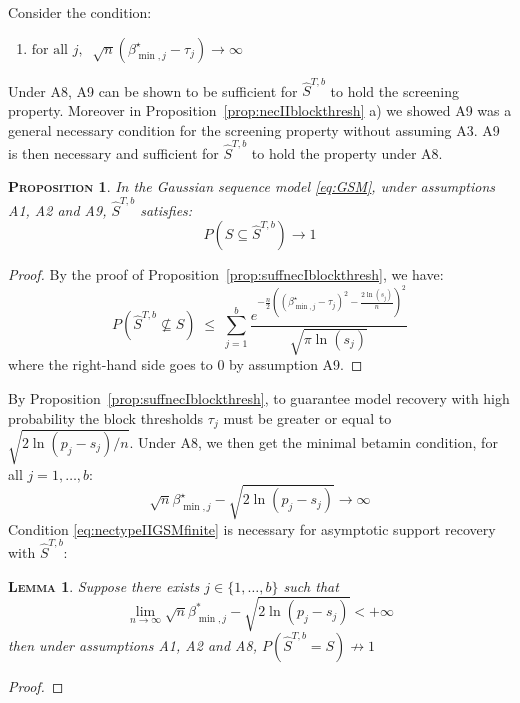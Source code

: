 \documentclass[aos]{imsart}
\theoremstyle{plain}
\newtheorem{prop}{\textsc{Proposition}}[section]
\newtheorem{lem}{\textsc{Lemma}}[section]
\begin{document}
\begin{supplement}
Consider the condition:
\begin{enumerate}[start=9,label={(A\arabic*)}]
    \item $\text{for all } j, \;\; \sqrt{n}(\beta_{\min,j}^{\star}-\tau_j) \to \infty$
\end{enumerate}
Under A8, A9 can be shown to be sufficient for $\hat{S}^{T,b}$ to hold the screening property. Moreover in Proposition~\ref{prop:necIIblockthresh} a) we showed A9 was a general necessary condition for the screening property without assuming A3. A9 is then necessary and sufficient for $\hat{S}^{T,b}$ to hold the property under A8.
\begin{prop}\label{prop:suffnecIIblockthreshbis}
 In the Gaussian sequence model \eqref{eq:GSM}, under assumptions A1, A2 and A9, $\hat{S}^{T,b}$ satisfies:
$$P(S\subseteq \hat{S}^{T,b} ) \to 1$$
\end{prop}
\begin{proof}
    By the proof of Proposition~\ref{prop:suffnecIblockthresh}, we have: \begin{equation*}
P\left(\hat{S}^{T,b} \not\subseteq S\right)\;\leq\; \sum_{j=1}^b\frac{e^{-\tfrac{n}{2}\left((\beta^\star_{\min,j}-\tau_j)^2-\tfrac{2\ln(s_j)}{n}\right)^2}}{\sqrt{\pi\ln(s_j)}}
 \end{equation*}
 where the right-hand side goes to 0 by assumption A9.
\end{proof}
By Proposition~\ref{prop:suffnecIblockthresh}, to guarantee model recovery with high probability the block thresholds $\tau_j$ must be greater or equal to $\sqrt{2\ln(p_j-s_j)/n}$. Under A8, we then get the minimal betamin condition, for all $j=1,\ldots,b$:
\begin{equation}\label{eq:nectypeIIGSMfinite}
    \sqrt{n}\beta_{\min,j}^{\star}-\sqrt{2\ln(p_j-s_j)} \to \infty
\end{equation}
Condition \eqref{eq:nectypeIIGSMfinite} is necessary for asymptotic support recovery with $\hat{S}^{T,b}$:
\begin{lem}\label{lem:necbetaminblockthresh2}
    Suppose there exists $j\in\{1,\ldots,b\}$ such that
    \begin{equation}\label{eq:necbetaminblockthreshbis}
      \lim_{n\to \infty}\sqrt{n}\beta_{\min,j}^*-\sqrt{2\ln(p_j-s_j)} < +\infty  
    \end{equation}
then under assumptions A1, A2 and A8,\;  $P(\hat{S}^{T,b} = S)\not \to 1$
\end{lem}

\begin{proof}


\end{proof}
\end{supplement}
\end{document}
